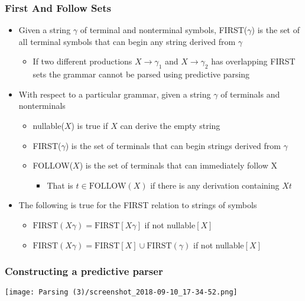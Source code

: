 \documentclass[11pt]{article}
\begin{document}
\subsubsection{First And Follow Sets}
\label{sec:orgfae6a50}
\begin{itemize}
\item Given a string \(\gamma\) of terminal and nonterminal symbols, FIRST(\(\gamma\)) is the set of all terminal symbols that can begin any string derived from \(\gamma\)
\begin{itemize}
\item If two different productions \(X \to \gamma_1\) and \(X \to \gamma_2\) has overlapping FIRST sets the grammar cannot be parsed using predictive parsing
\end{itemize}

\item With respect to a particular grammar, given a string \(\gamma\) of terminals and nonterminals
\begin{itemize}
\item nullable(\(X\)) is true if \(X\) can derive the empty string
\item FIRST(\(\gamma\)) is the set of terminals that can begin strings derived from \(\gamma\)
\item FOLLOW(\(X\)) is the set of terminals that can immediately follow X
\begin{itemize}
\item That is \(t \in \text{FOLLOW} (X)\) if there is any derivation containing \(Xt\)
\end{itemize}
\end{itemize}

\item The following is true for the FIRST relation to strings of symbols
\begin{itemize}
\item \(\text{FIRST}(X\gamma) = \text{FIRST}[X\gamma]\) if not nullable\([X]\)
\item \(\text{FIRST}(X\gamma) = \text{FIRST}[X] \cup \text{FIRST}(\gamma)\) if not nullable\([X]\)
\end{itemize}
\end{itemize}

\subsubsection{Constructing a predictive parser}
\label{sec:org92ccf26}
\begin{center}
\texttt{[image: Parsing (3)/screenshot\_2018-09-10\_17-34-52.png]}
\end{center}
\end{document}
